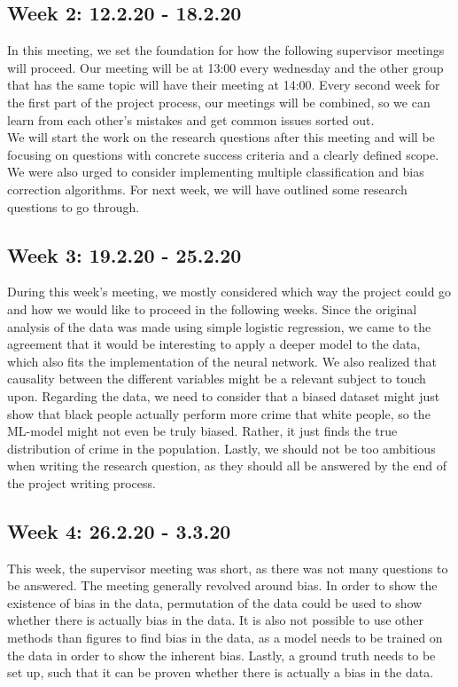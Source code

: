 \documentclass[11pt, fleqn]{article}
\begin{document}
\subsection*{Week 2: 12.2.20 - 18.2.20}
In this meeting, we set the foundation for how the following supervisor meetings will proceed. Our meeting will be at 13:00 every wednesday and the other group that has the same topic will have their meeting at 14:00. Every second week for the first part of the project process, our meetings will be combined, so we can learn from each other's mistakes and get common issues sorted out. \\
We will start the work on the research questions after this meeting and will be focusing on questions with concrete success criteria and a clearly defined scope. We were also urged to consider implementing multiple classification and bias correction algorithms. For next week, we will have outlined some research questions to go through.

\subsection*{Week 3: 19.2.20 - 25.2.20}
During this week's meeting, we mostly considered which way the project could go and how we would like to proceed in the following weeks. Since the original analysis of the data was made using simple logistic regression, we came to the agreement that it would be interesting to apply a deeper model to the data, which also fits the implementation of the neural network. We also realized that causality between the different variables might be a relevant subject to touch upon. Regarding the data, we need to consider that a biased dataset might just show that black people actually perform more crime that white people, so the ML-model might not even be truly biased. Rather, it just finds the true distribution of crime in the population. Lastly, we should not be too ambitious when writing the research question, as they should all be answered by the end of the project writing process.

\subsection*{Week 4: 26.2.20 - 3.3.20}
This week, the supervisor meeting was short, as there was not many questions to be answered. The meeting generally revolved around bias. In order to show the existence of bias in the data, permutation of the data could be used to show whether there is actually bias in the data. It is also not possible to use other methods than figures to find bias in the data, as a model needs to be trained on the data in order to show the inherent bias. Lastly, a ground truth needs to be set up, such that it can be proven whether there is actually a bias in the data.
\end{document}

